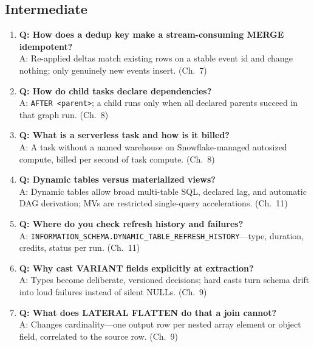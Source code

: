 \subsection{Intermediate}
\begin{enumerate}
    \item \textbf{Q: How does a dedup key make a stream-consuming MERGE idempotent?}\\
    A: Re-applied deltas match existing rows on a stable event id and change nothing; only genuinely new events insert. (Ch.~7)
    \item \textbf{Q: How do child tasks declare dependencies?}\\
    A: \texttt{AFTER <parent>}; a child runs only when all declared parents succeed in that graph run. (Ch.~8)
    \item \textbf{Q: What is a serverless task and how is it billed?}\\
    A: A task without a named warehouse on Snowflake-managed autosized compute, billed per second of task compute. (Ch.~8)
    \item \textbf{Q: Dynamic tables versus materialized views?}\\
    A: Dynamic tables allow broad multi-table SQL, declared lag, and automatic DAG derivation; MVs are restricted single-query accelerations. (Ch.~11)
    \item \textbf{Q: Where do you check refresh history and failures?}\\
    A: \texttt{INFORMATION\_SCHEMA.DYNAMIC\_TABLE\_REFRESH\_HISTORY}---type, duration, credits, status per run. (Ch.~11)
    \item \textbf{Q: Why cast VARIANT fields explicitly at extraction?}\\
    A: Types become deliberate, versioned decisions; hard casts turn schema drift into loud failures instead of silent NULLs. (Ch.~9)
    \item \textbf{Q: What does LATERAL FLATTEN do that a join cannot?}\\
    A: Changes cardinality---one output row per nested array element or object field, correlated to the source row. (Ch.~9)
\end{enumerate}

